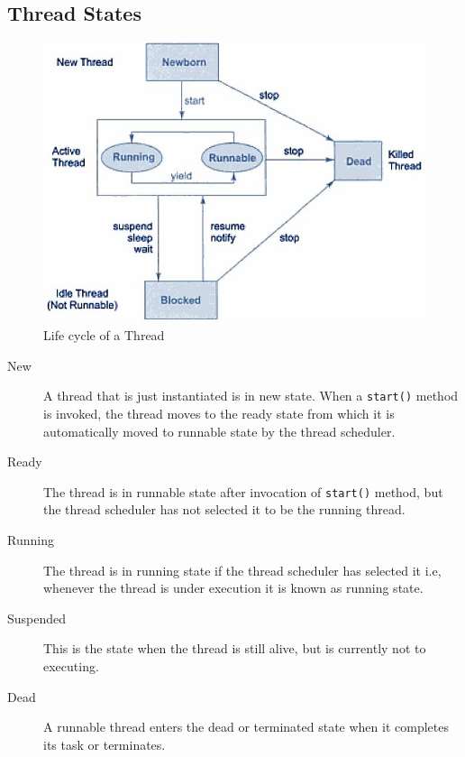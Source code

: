 \documentclass[11pt,a4paper]{article}
\begin{document}
\subsection*{Thread States}

 
\begin{figure}[ht]
\begin{center}
\includegraphics[scale=0.4]{ThreadStates.png}
\caption{Life cycle of a Thread}
\end{center}
\end{figure}


\begin{description}
\item [New] A thread that is just instantiated is in new state. When a \texttt{start()} method is invoked, the thread moves to the ready state from which it is automatically moved to runnable state by the thread scheduler. 
\item [Ready] The thread is in runnable state after invocation of \texttt{start()} method, but the thread scheduler has not selected it to be the running thread. 
\item [Running] The thread is in running state if the thread scheduler has selected it i.e, whenever the thread is under execution it is known as running state.
\item [Suspended] This is the state when the thread is still alive, but is currently not to executing. 
\item [Dead] A runnable thread enters the dead or terminated state when it completes its task or terminates. 
\end{description}
\end{document}
